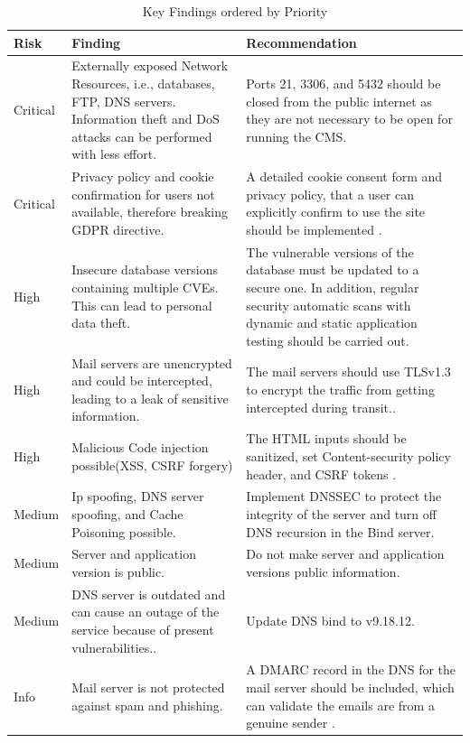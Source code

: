 \begingroup
\centering
\setlength{\tabcolsep}{6.5pt} %
\renewcommand{\arraystretch}{1.8} %
\begin{longtable}{ |p{1.5cm}| p{6cm}|p{6.3cm}|}
\caption{Key Findings ordered by Priority}
    \label{table:key_findings}
\hline
\rowcolor{grey!15}
\textbf{Risk}  & \textbf{Finding}& \textbf{Recommendation}\\
\hline
\cellcolor{red!95} Critical  & Externally exposed Network Resources, i.e., databases, FTP, DNS servers. Information theft and DoS attacks can be performed with less effort.
 & Ports 21, 3306, and 5432 should be closed from the public internet as they are not necessary to be open for running the CMS. %
\\
\hline
\cellcolor{red!95} Critical  & Privacy policy and cookie confirmation for users not available, therefore breaking GDPR directive. & A detailed cookie consent form and privacy policy, that a user can explicitly confirm to use the site should be implemented \citep[p.~2]{godr_cookie}.
\\
\hline
\cellcolor{red!55} High  & Insecure database versions  containing multiple CVEs. This can lead to personal data theft.
 & The vulnerable versions of the database must be updated to a secure one. In addition, regular security automatic scans with dynamic and static application testing should be carried out.
\\
\hline
\cellcolor{red!55} High  & Mail servers are unencrypted and could be intercepted, leading to a leak of sensitive information. & The mail servers should use TLSv1.3 to encrypt the traffic from getting intercepted during transit.\citep[p.~10]{tls_smtp}. 
\\
\hline
\cellcolor{red!55} High  & Malicious Code injection possible(XSS, CSRF forgery) & The HTML inputs should be sanitized, set Content-security policy header, and CSRF tokens \citep[p.~75]{xss_crsf}.
\\
\hline
\cellcolor{yellow!95} Medium  & Ip spoofing, DNS server spoofing, and Cache Poisoning possible.
& Implement DNSSEC to protect the integrity of the server and turn off DNS recursion in the Bind server. \citep[p.~38]{guo2006spoof}
\\
\hline
\cellcolor{yellow!95} Medium  & Server and application version is public.& Do not make server and application versions public information.
\\
\hline
\cellcolor{yellow!95} Medium  & DNS server is outdated and can cause an outage of the service because of present vulnerabilities..& Update DNS bind to v9.18.12.
\\
\hline
\cellcolor{grey!55} Info  & Mail server is not protected against spam and phishing.& A DMARC record in the DNS for the mail server should be included, which can validate the emails are from a genuine sender \citep[p.~7]{dmarc}.
\\
\hline
\end{longtable}
\endgroup

